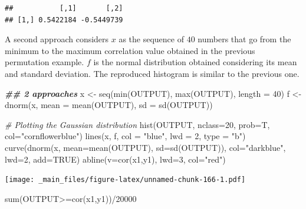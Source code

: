 \documentclass[
  notitlepage,
  onecolumn,
  openany]{book}
\newenvironment{Shaded}{\begin{snugshade}}{\end{snugshade}}
\newcommand{\AttributeTok}[1]{\textcolor[rgb]{0.77,0.63,0.00}{#1}}
\newcommand{\CommentTok}[1]{\textcolor[rgb]{0.56,0.35,0.01}{\textit{#1}}}
\newcommand{\ConstantTok}[1]{\textcolor[rgb]{0.00,0.00,0.00}{#1}}
\newcommand{\DecValTok}[1]{\textcolor[rgb]{0.00,0.00,0.81}{#1}}
\newcommand{\DocumentationTok}[1]{\textcolor[rgb]{0.56,0.35,0.01}{\textbf{\textit{#1}}}}
\newcommand{\FunctionTok}[1]{\textcolor[rgb]{0.00,0.00,0.00}{#1}}
\newcommand{\NormalTok}[1]{#1}
\newcommand{\OtherTok}[1]{\textcolor[rgb]{0.56,0.35,0.01}{#1}}
\newcommand{\SpecialCharTok}[1]{\textcolor[rgb]{0.00,0.00,0.00}{#1}}
\newcommand{\StringTok}[1]{\textcolor[rgb]{0.31,0.60,0.02}{#1}}
\begin{document}
\begin{verbatim}
##           [,1]       [,2]
## [1,] 0.5422184 -0.5449739
\end{verbatim}

A second approach considers \(x\) as the sequence of \(40\) numbers that go from the minimum to the maximum correlation value obtained in the previous permutation example. \(f\) is the normal distribution obtained considering its mean and standard deviation. The reproduced histogram is similar to the previous one.

\begin{Shaded}
\begin{Highlighting}[]
\DocumentationTok{\#\# 2 approaches}
\NormalTok{x }\OtherTok{\textless{}{-}} \FunctionTok{seq}\NormalTok{(}\FunctionTok{min}\NormalTok{(OUTPUT), }\FunctionTok{max}\NormalTok{(OUTPUT), }\AttributeTok{length =} \DecValTok{40}\NormalTok{)}
\NormalTok{f }\OtherTok{\textless{}{-}} \FunctionTok{dnorm}\NormalTok{(x, }\AttributeTok{mean =} \FunctionTok{mean}\NormalTok{(OUTPUT), }\AttributeTok{sd =} \FunctionTok{sd}\NormalTok{(OUTPUT))}

\CommentTok{\# Plotting the Gaussian distribution}
\FunctionTok{hist}\NormalTok{(OUTPUT, }\AttributeTok{nclass=}\DecValTok{20}\NormalTok{, }\AttributeTok{prob=}\NormalTok{T, }\AttributeTok{col=}\StringTok{"cornflowerblue"}\NormalTok{)}
\FunctionTok{lines}\NormalTok{(x, f, }\AttributeTok{col =} \StringTok{"blue"}\NormalTok{, }\AttributeTok{lwd =} \DecValTok{2}\NormalTok{, }\AttributeTok{type =} \StringTok{"b"}\NormalTok{)}
\FunctionTok{curve}\NormalTok{(}\FunctionTok{dnorm}\NormalTok{(x, }\AttributeTok{mean=}\FunctionTok{mean}\NormalTok{(OUTPUT), }\AttributeTok{sd=}\FunctionTok{sd}\NormalTok{(OUTPUT)), }
      \AttributeTok{col=}\StringTok{"darkblue"}\NormalTok{, }\AttributeTok{lwd=}\DecValTok{2}\NormalTok{, }\AttributeTok{add=}\ConstantTok{TRUE}\NormalTok{)}
\FunctionTok{abline}\NormalTok{(}\AttributeTok{v=}\FunctionTok{cor}\NormalTok{(x1,y1), }\AttributeTok{lwd=}\DecValTok{3}\NormalTok{, }\AttributeTok{col=}\StringTok{"red"}\NormalTok{)}
\end{Highlighting}
\end{Shaded}

\texttt{[image: \_main\_files/figure-latex/unnamed-chunk-166-1.pdf]}

\begin{Shaded}
\begin{Highlighting}[]
\FunctionTok{sum}\NormalTok{(OUTPUT}\SpecialCharTok{\textgreater{}=}\FunctionTok{cor}\NormalTok{(x1,y1))}\SpecialCharTok{/}\DecValTok{20000}
\end{Highlighting}
\end{Shaded}
\end{document}
